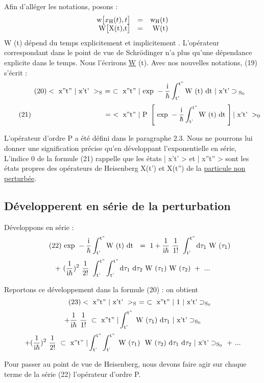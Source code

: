 Afin d'alléger les notations, posons :
\[
\begin{array}{rcr}
\text{w}\big[x_{\text{H}}(t),t\big] & = & \text{w}_{\text{H}}\text{(t)} \\
\text{W}\big[\text{X(t),t}\big] & = & \text{W(t)}
\end{array}
\]
W (t) dépend du temps explicitement et implicitement  . L'opérateur correspondant dans le point de vue de Schrödinger
n'a plus qu'une dépendance explicite dans le temps. Nous l'écrirons \ul{W} (t).
Avec nos nouvelles notations, (19) s'écrit :
\[
\tag{20} <\text{ x''t'' }|\text{ x't' }>_{\text{S}}\ =\ \subset \text{ x''t'' }|\text{ exp }-\frac{\text{i}}{\hbar}\int_{\text{t'}}^{\text{t''}}\text{W (t) dt }|\text{ x't'}\supset_{\text{ S}_0}
\]
\[
\tag{21} \ \ \ \ \ \ \ \ \ \ \ \ \ \ \ \ \ \ \ \ \ \ \ \ \ \ \ \ \ \ \ =\ <\mt{ x''t'' }|\mt{ P }\left[\mt{ exp }-\frac{\mt{i}}{\hbar}\int_\mt{t'}^\mt{t''}\mt{W (t) dt }\right]|\mt{ x't' }>_0
\]

L'opérateur d'ordre P a été défini dans le paragraphe 2.3. Nous ne pourrons lui
donner une signification précise qu'en développant l'exponentielle en série,
L'indice 0 de la formule (21) rappelle que les états | x't' > et | x''t'' >
sont les états propres des opérateurs de Heisenberg X(t') et X(t'') de la
\ul{particule non perturbée}.

\subsection{Développerent en série de la perturbation}%
Développons en série :
\[
\tag{22} \mt{ exp }-\frac{\mt{i}}{\hbar}\int_\mt{t'}^\mt{t''}\mt{W (t) dt }\ =\ 1 +\frac{1}{\mt{i}\hbar}\ \frac{1}{1!}\ \int_\mt{t'}^\mt{t''}\mt{d}\tau_1\mt{ W }(\tau_1)
\]
\[
+\ (\frac{1}{\mt{i}\hbar})^2\ \frac{1}{2!}\ \int_\mt{t'}^\mt{t''}\int_\mt{t'}^\mt{t''}\mt{d}\tau_1\ \mt{d}\tau_2\mt{ W }(\tau_1)\mt{ W }(\tau_2)\ +\ ...
\]

Reportons ce développement dans la formule (20) : on obtient
\[
\tag{23} <\text{ x''t'' }|\text{ x't' }>_{\text{S}}\ =\ \subset \text{ x''t'' }|\ 1\ |\text{ x't'}\supset_{\text{S}_0}
\]
\[
 +\frac{1}{\text{i}\hbar}\ \frac{1}{1!}\  \subset \text{ x''t'' }|\int_{\text{t'}}^{\text{t''}}\text{ W }(\tau_1)\ \text{d}\tau_1\ |\text{ x't'}\supset_{\text{S}_0}
\]
\[
 +(\frac{1}{\mt{i}\hbar})^2\ \frac{1}{2!}\  \subset \mt{ x''t'' }|\int_\mt{t'}^\mt{t''}\int_\mt{t'}^\mt{t''}\mt{ W }(\tau_1)\ \mt{ W }(\tau_2)\ \mt{d}\tau_1\ \mt{d}\tau_2\ |\mt{ x't'}\supset_{\mt{S}_0}\ +\ ...
\]
%

Pour passer au point de vue de Heisenberg, nous devons faire
agir sur chaque terme de la série (22) l'opérateur d'ordre P.

